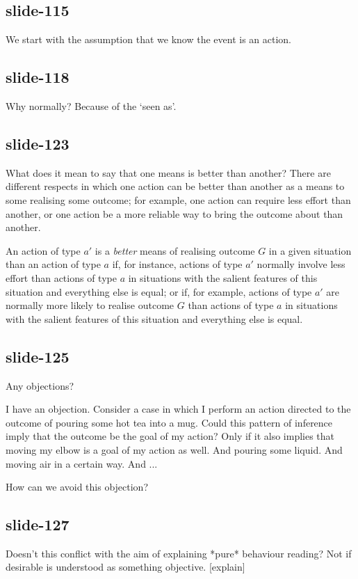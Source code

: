 \documentclass[12pt,\papersize]{extarticle}
\begin{document}
\subsection{slide-115}
We start with the assumption that we know the event is an action.

\subsection{slide-118}
Why normally? Because of the ‘seen as’.

\subsection{slide-123}
What does it mean to say that one means is better than another?
There are different respects in which one action can be better than another as a means
to some realising some outcome; for example, one action can require less effort than
another, or one action be a more reliable way to bring the outcome about than another.

An action of type $a'$ is a \emph{better} means of realising outcome $G$ in a given situation than an action of type $a$ if, for instance, actions of type $a'$ normally involve less effort than actions of type $a$
in situations with the salient features of this situation
and everything else is equal;
or if, for example, actions of type $a'$ are normally more likely to realise outcome $G$ than actions of type $a$
in situations with the salient features of this situation
and everything else is equal.

\subsection{slide-125}
Any objections?

I have an objection.
Consider a case in which I perform an action directed to
the outcome of pouring some hot tea into a mug.
Could this pattern of inference imply that the outcome be the goal of my action?
Only if it also implies that moving my elbow is a goal of my action
as well.
And pouring some liquid.
And moving air in a certain way.
And ...

How can we avoid this objection?

\subsection{slide-127}
Doesn’t this conflict with the aim of explaining *pure* behaviour reading?
Not if desirable is understood as something objective.
[explain]
\end{document}
